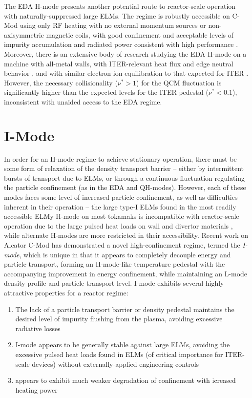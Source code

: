 The EDA H-mode presents another potential route to reactor-scale operation with naturally-suppressed large ELMs.  The regime is robustly accessible on C-Mod using only RF heating with no external momentum sources or non-axisymmetric magnetic coils, with good confinement and acceptable levels of impurity accumulation and radiated power consistent with high performance \cite{Hughes2011}.  Moreover, there is an extensive body of research studying the EDA H-mode on a machine with all-metal walls, with ITER-relevant heat flux and edge neutral behavior \cite{Hubbard2007,Greenwald2007}, and with similar electron-ion equilibration to that expected for ITER \cite{McDermott2009a}.  However, the necessary collisionality ($\nu^* > 1$) for the QCM fluctuation is significantly higher than the expected levels for the ITER pedestal ($\nu^* < 0.1$), inconsistent with unaided access to the EDA regime.\nicesectionending

\section{I-Mode}\label{sec:hcr_imode}

In order for an H-mode regime to achieve stationary operation, there must be some form of relaxation of the density transport barrier -- either by intermittent bursts of transport due to ELMs, or through a continuous fluctuation regulating the particle confinement (as in the EDA and QH-modes).  However, each of these modes faces some level of increased particle confinement, as well as difficulties inherent in their operation -- the large type-I ELMs found in the most readily accessible ELMy H-mode on most tokamaks is incompatible with reactor-scale operation due to the large pulsed heat loads on wall and divertor materials \cite{Federici2003,Loarte2003}, while alternate H-modes are more restricted in their accessibility.  Recent work on Alcator C-Mod has demonstrated a novel high-confinement regime, termed the \emph{I-mode}, which is unique in that it appears to completely decouple energy and particle transport, forming an H-mode-like temperature pedestal with the accompanying improvement in energy confinement, while maintaining an L-mode density profile and particle transport level.  I-mode exhibits several highly attractive properties for a reactor regime:

\begin{enumerate}
 \item The lack of a particle transport barrier or density pedestal maintains the desired level of impurity flushing from the plasma, avoiding excessive radiative losses
 \item I-mode appears to be generally stable against large ELMs, avoiding the excessive pulsed heat loads found in ELMs (of critical importance for ITER-scale devices) without externally-applied engineering controls
 \item appears to exhibit much weaker degradation of confinement with icreased heating power
\end{enumerate}

